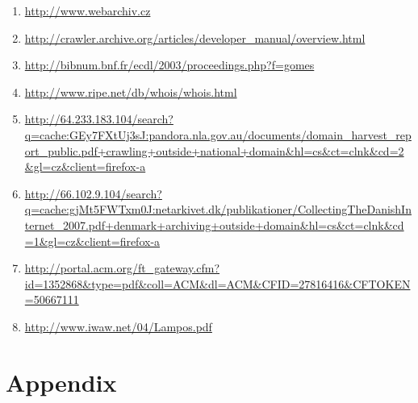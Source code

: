 \documentclass[11pt,a4paper]{article}
\begin{document}
\begin{enumerate}
\item \url{http://www.webarchiv.cz}
\item \url{http://crawler.archive.org/articles/developer\_manual/overview.html}
\item \url{http://bibnum.bnf.fr/ecdl/2003/proceedings.php?f=gomes}
\item \url{http://www.ripe.net/db/whois/whois.html}
\item \url{ http://64.233.183.104/search?q=cache:GEy7FXtUj3sJ:pandora.nla.gov.au/documents/domain\_harvest\_report\_public.pdf+crawling+outside+national+domain&hl=cs&ct=clnk&cd=2&gl=cz&client=firefox-a}
\item \url{http://66.102.9.104/search?q=cache:gjMt5FWTxm0J:netarkivet.dk/publikationer/CollectingTheDanishInternet\_2007.pdf+denmark+archiving+outside+domain&hl=cs&ct=clnk&cd=1&gl=cz&client=firefox-a}
\item \url{http://portal.acm.org/ft\_gateway.cfm?id=1352868&type=pdf&coll=ACM&dl=ACM&CFID=27816416&CFTOKEN=50667111}
\item \url{http://www.iwaw.net/04/Lampos.pdf}
\end{enumerate}


\newpage
\section*{Appendix}
\end{document}
